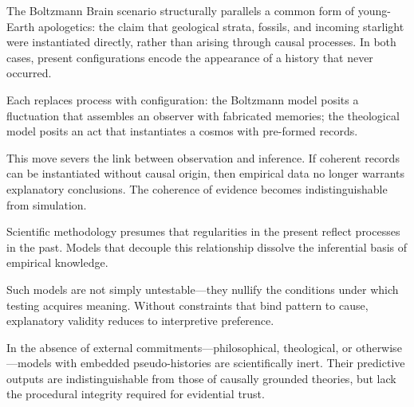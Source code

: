 \newpage

\begin{commentary}
The Boltzmann Brain scenario structurally parallels a common form of young-Earth apologetics: the claim that geological strata, fossils, and incoming starlight were instantiated directly, rather than arising through causal processes. In both cases, present configurations encode the appearance of a history that never occurred.

Each replaces process with configuration: the Boltzmann model posits a fluctuation that assembles an observer with fabricated memories; the theological model posits an act that instantiates a cosmos with pre-formed records.

This move severs the link between observation and inference. If coherent records can be instantiated without causal origin, then empirical data no longer warrants explanatory conclusions. The coherence of evidence becomes indistinguishable from simulation.

Scientific methodology presumes that regularities in the present reflect processes in the past. Models that decouple this relationship dissolve the inferential basis of empirical knowledge.

Such models are not simply untestable—they nullify the conditions under which testing acquires meaning. Without constraints that bind pattern to cause, explanatory validity reduces to interpretive preference.

In the absence of external commitments—philosophical, theological, or otherwise—models with embedded pseudo-histories are scientifically inert. Their predictive outputs are indistinguishable from those of causally grounded theories, but lack the procedural integrity required for evidential trust.
\end{commentary}

